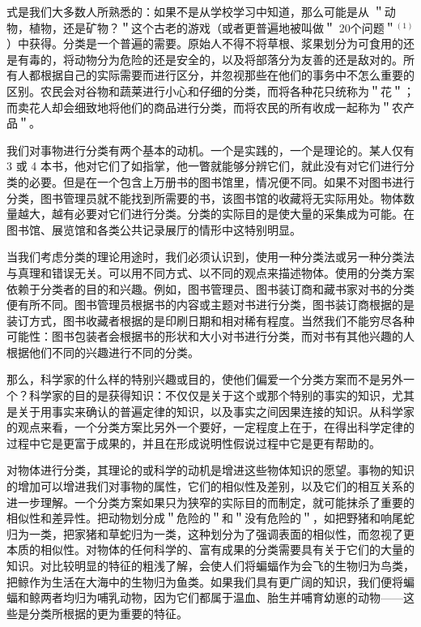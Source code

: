 式是我们大多数人所熟悉的：如果不是从学校学习中知道，那么可能是从 ＂动物，植物，还是矿物？＂这个古老的游戏（或者更普遍地被叫做＂ 20个问题＂${ }^{(1)}$ ）中获得。分类是一个普遍的需要。原始人不得不将草根、浆果划分为可食用的还是有毒的，将动物分为危险的还是安全的，以及将部落分为友善的还是敌对的。所有人都根据自己的实际需要而进行区分，并忽视那些在他们的事务中不怎么重要的区别。农民会对谷物和蔬莱进行小心和仔细的分类，而将各种花只统称为＂花＂；而卖花人却会细致地将他们的商品进行分类，而将农民的所有收成一起称为＂农产品＂。

我们对事物进行分类有两个基本的动机。一个是实践的，一个是理论的。某人仅有 3 或 4 本书，他对它们了如指掌，他一瞥就能够分辨它们，就此没有对它们进行分类的必要。但是在一个包含上万册书的图书馆里，情况便不同。如果不对图书进行分类，图书管理员就不能找到所需要的书，该图书馆的收藏将无实际用处。物体数量越大，越有必要对它们进行分类。分类的实际目的是使大量的采集成为可能。在图书馆、展览馆和各类公共记录展厅的情形中这特别明显。

当我们考虑分类的理论用途时，我们必须认识到，使用一种分类法或另一种分类法与真理和错误无关。可以用不同方式、以不同的观点来描述物体。使用的分类方案依赖于分类者的目的和兴趣。例如，图书管理员、图书装订商和藏书家对书的分类便有所不同。图书管理员根据书的内容或主题对书进行分类，图书装订商根据的是装订方式，图书收藏者根据的是印刷日期和相对稀有程度。当然我们不能穷尽各种可能性：图书包装者会根据书的形状和大小对书进行分类，而对书有其他兴趣的人根据他们不同的兴趣进行不同的分类。

那么，科学家的什么样的特别兴趣或目的，使他们偏爱一个分类方案而不是另外一个？科学家的目的是获得知识：不仅仅是关于这个或那个特别的事实的知识，尤其是关于用事实来确认的普遍定律的知识，以及事实之间因果连接的知识。从科学家的观点来看，一个分类方案比另外一个要好，一定程度上在于，在得出科学定律的过程中它是更富于成果的，并且在形成说明性假说过程中它是更有帮助的。

对物体进行分类，其理论的或科学的动机是增进这些物体知识的愿望。事物的知识的增加可以增进我们对事物的属性，它们的相似性及差别，以及它们的相互关系的进一步理解。一个分类方案如果只为狭窄的实际目的而制定，就可能抹杀了重要的相似性和差异性。把动物划分成＂危险的＂和＂没有危险的＂，如把野猪和响尾蛇归为一类，把家猪和草蛇归为一类，这种划分为了强调表面的相似性，而忽视了更本质的相似性。对物体的任何科学的、富有成果的分类需要具有关于它们的大量的知识。对比较明显的特征的粗浅了解，会使人们将蝙蝠作为会飞的生物归为鸟类，把鲸作为生活在大海中的生物归为鱼类。如果我们具有更广阔的知识，我们便将蝙蝠和鲸两者均归为哺乳动物，因为它们都属于温血、胎生并哺育幼崽的动物——这些是分类所根据的更为重要的特征。

